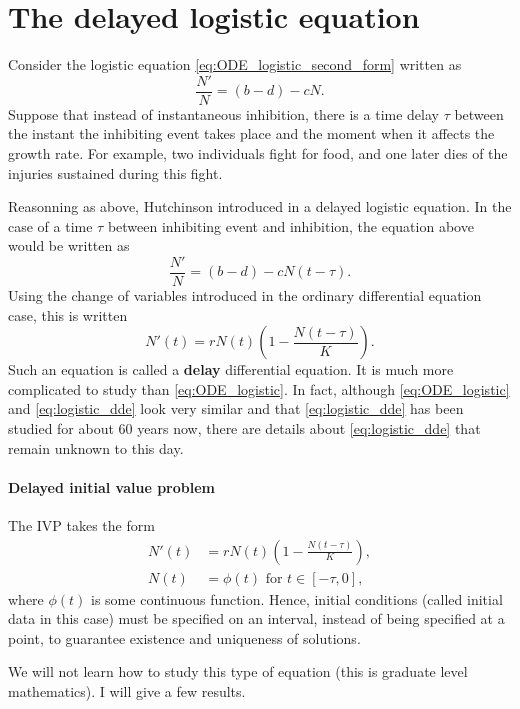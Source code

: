 \section{The delayed logistic equation}
\label{sec:DDE_logistic}
Consider the logistic equation \eqref{eq:ODE_logistic_second_form} written as
\[
\frac{N'}{N}=(b-d)-cN.
\]
Suppose that instead of instantaneous inhibition, there is a time delay $\tau$ between the instant the inhibiting event takes place and the moment when it affects the growth rate.
For example, two individuals fight for food, and one later dies of the injuries sustained during this fight. 

Reasonning as above, Hutchinson introduced in \cite{Hutchinson1948} a delayed logistic equation. In the case of a time $\tau$ between inhibiting event and inhibition, the equation above would be written as 
\[
\frac{N'}N=(b-d)-cN(t-\tau).
\]
Using the change of variables introduced in the ordinary differential equation case, this is written
\begin{equation}\label{eq:logistic_dde}
N'(t)=rN(t)\left(1-\frac{N(t-\tau)}K\right).
\end{equation}
Such an equation is called a \textbf{delay} differential equation. It is much more complicated to study than \eqref{eq:ODE_logistic}. In fact, although \eqref{eq:ODE_logistic} and \eqref{eq:logistic_dde} look very similar and that \eqref{eq:logistic_dde} has been studied for about 60 years now, there are details about \eqref{eq:logistic_dde} that remain unknown to this day.

\paragraph{Delayed initial value problem}
The IVP takes the form
\begin{equation}\label{ivp:logistic_dde}
\begin{aligned}
N'(t)&= rN(t)\left(1-\frac{N(t-\tau)}K\right),\\
N(t) &= \phi(t)\textrm{ for }t\in[-\tau,0],
\end{aligned}
\end{equation}
where $\phi(t)$ is some continuous function. Hence, initial conditions (called initial data in this case) must be specified on an interval, instead of being specified at a point, to guarantee existence and uniqueness of solutions.

We will not learn how to study this type of equation (this is graduate level mathematics). I will give a few results.

